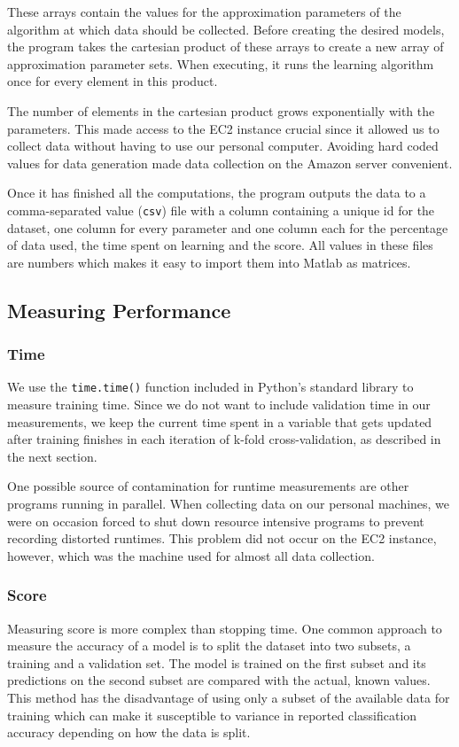 \documentclass[a4paper,12pt,twoside,openright]{report}
\begin{document}
These arrays contain the values for the approximation parameters of the algorithm at which data should be collected. Before creating the desired models, the program takes the cartesian product of these arrays to create a new array of approximation parameter sets. When executing, it runs the learning algorithm once for every element in this product. 

The number of elements in the cartesian product grows exponentially with the parameters. This made access to the EC2 instance crucial since it allowed us to collect data without having to use our personal computer. Avoiding hard coded values for data generation made data collection on the Amazon server convenient.

Once it has finished all the computations, the program outputs the data to a comma-separated value (\texttt{csv}) file with a column containing a unique id for the dataset, one column for every parameter and one column each for the percentage of data used, the time spent on learning and the score. All values in these files are numbers which makes it easy to import them into Matlab as matrices. 

\subsection{Measuring Performance}

\subsubsection{Time}
We use the \texttt{time.time()} function included in Python's standard library to measure training time. Since we do not want to include validation time in our measurements, we keep the current time spent in a variable that gets updated after training finishes in each iteration of k-fold cross-validation, as described in the next section.

One possible source of contamination for runtime measurements are other programs running in parallel. When collecting data on our personal machines, we were on occasion forced to shut down resource intensive programs to prevent recording distorted runtimes. This problem did not occur on the EC2 instance, however, which was the machine used for almost all data collection.

\subsubsection{Score}
Measuring score is more complex than stopping time. One common approach to measure the accuracy of a model is to split the dataset into two subsets, a training and a validation set. The model is trained on the first subset and its predictions on the second subset are compared with the actual, known values. This method has the disadvantage of using only a subset of the available data for training which can make it susceptible to variance in reported classification accuracy depending on how the data is split.
\end{document}

